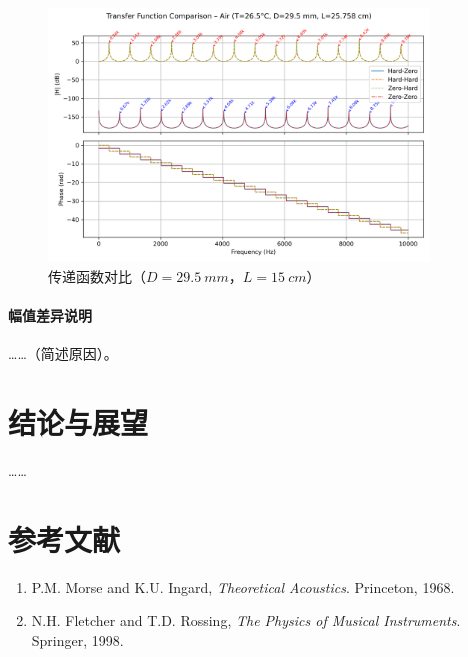 \documentclass[12pt,a4paper]{article}
\begin{document}
\begin{figure}[h]
  \centering
  \includegraphics[width=0.9\textwidth]{../02-code/tube_transfer_compare.png}
  \caption{传递函数对比（$D=\SI{29.5}{mm}$，$L=\SI{15}{cm}$）}
  \label{fig:tf}
\end{figure}

\paragraph{幅值差异说明} ……（简述原因）。

\section{结论与展望}
……

\section*{参考文献}
\begin{enumerate}
  \item P.M. Morse and K.U. Ingard, \emph{Theoretical Acoustics}. Princeton, 1968.
  \item N.H. Fletcher and T.D. Rossing, \emph{The Physics of Musical Instruments}. Springer, 1998.
\end{enumerate}
\end{document}
